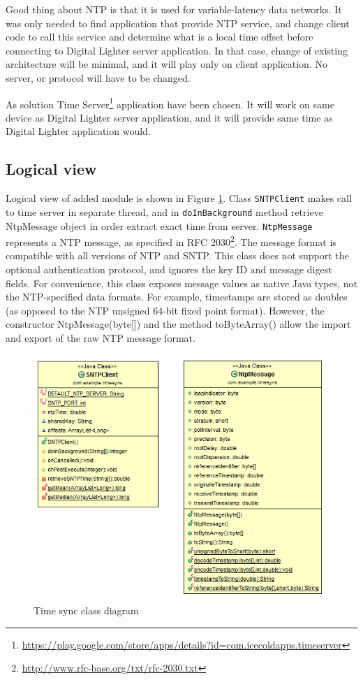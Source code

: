 Good thing about NTP is that it is used for variable-latency data networks. It was only needed to find application that provide NTP service, and change client code to call this service and determine what is a local time offset before connecting to Digital Lighter server application. In that case, change of existing architecture will be minimal, and it will play only on client application. No server, or protocol will have to be changed.

As solution Time Server\footnote{\url{https://play.google.com/store/apps/details?id=com.icecoldapps.timeserver}} application have been chosen. It will work on same device as Digital Lighter server application, and it will provide same time as Digital Lighter application would.

\subsection{Logical view}
Logical view of added module is shown in Figure \ref{fig:Time_Sync_class }. Class \texttt{SNTPClient} makes call to time server in separate thread, and in \texttt{doInBackground} method retrieve NtpMessage object in order extract exact time from server. \texttt{NtpMessage} represents a NTP message, as specified in RFC 2030\footnote{\url{http://www.rfc-base.org/txt/rfc-2030.txt}}. The message format is compatible with all versions of NTP and SNTP. This class does not support the optional authentication protocol, and ignores the key ID and message digest fields. For convenience, this class exposes message values as native Java types, not the NTP-specified data formats. For example, timestamps are stored as doubles (as opposed to the NTP unsigned 64-bit fixed point format). However, the constructor NtpMessage(byte[]) and the method toByteArray() allow the import and export of the raw NTP message format.

\begin{figure}[h]
	\centering
		\includegraphics[width=14cm]{sprint5/sprint5_class_diagram.png}
	\caption{Time sync class diagram}
	\label{fig:Time_Sync_class }
\end{figure}

